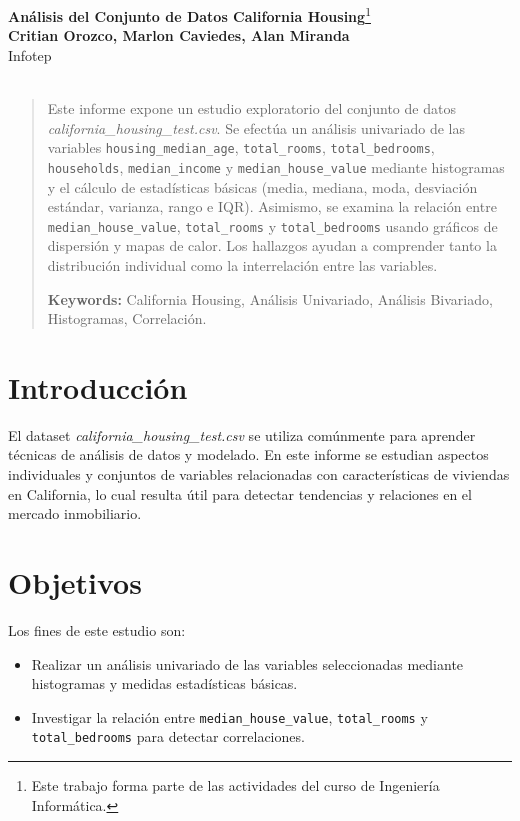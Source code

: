 \documentclass[a4paper, 10pt]{article}
\begin{document}
\begin{center}

\LARGE
\textbf{Análisis del Conjunto de Datos California Housing}\footnote{Este trabajo forma parte de las actividades del curso de Ingeniería Informática.}\\[6pt]
\small
\textbf{Critian Orozco, Marlon Caviedes, Alan Miranda}\\[6pt]
Infotep\\
\texttt{}\\[6pt]
\end{center}

\begin{abstract}
Este informe expone un estudio exploratorio del conjunto de datos \textit{california\_housing\_test.csv}. Se efectúa un análisis univariado de las variables \texttt{housing\_median\_age}, \texttt{total\_rooms}, \texttt{total\_bedrooms}, \texttt{households}, \texttt{median\_income} y \texttt{median\_house\_value} mediante histogramas y el cálculo de estadísticas básicas (media, mediana, moda, desviación estándar, varianza, rango e IQR). Asimismo, se examina la relación entre \texttt{median\_house\_value}, \texttt{total\_rooms} y \texttt{total\_bedrooms} usando gráficos de dispersión y mapas de calor. Los hallazgos ayudan a comprender tanto la distribución individual como la interrelación entre las variables.
\vskip 2mm

\textbf{Keywords:} California Housing, Análisis Univariado, Análisis Bivariado, Histogramas, Correlación.
\end{abstract}

\section{Introducción}\label{s:1}
El dataset \textit{california\_housing\_test.csv} se utiliza comúnmente para aprender técnicas de análisis de datos y modelado. En este informe se estudian aspectos individuales y conjuntos de variables relacionadas con características de viviendas en California, lo cual resulta útil para detectar tendencias y relaciones en el mercado inmobiliario.

\section{Objetivos}\label{s:2}
Los fines de este estudio son:
\begin{itemize}
    \item Realizar un análisis univariado de las variables seleccionadas mediante histogramas y medidas estadísticas básicas.
    \item Investigar la relación entre \texttt{median\_house\_value}, \texttt{total\_rooms} y \texttt{total\_bedrooms} para detectar correlaciones.
\end{itemize}
\end{document}
